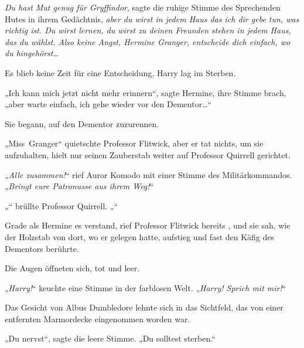 \emph{Du hast Mut genug für Gryffindor}, sagte die ruhige Stimme des Sprechenden Hutes in ihrem Gedächtnis, \emph{aber du wirst in jedem Haus das ich dir gebe tun, was richtig ist. Du wirst lernen, du wirst zu deinen Freunden stehen in jedem Haus, das du wählst. Also keine Angst, Hermine Granger, entscheide dich einfach, wo du hingehörst…}

Es blieb keine Zeit für eine Entscheidung, Harry lag im Sterben.

„Ich kann mich jetzt nicht mehr erinnern“, sagte Hermine, ihre Stimme brach, „aber warte einfach, ich gehe wieder vor den Dementor…“

Sie begann, auf den Dementor zuzurennen.

„Miss~Granger“ quietschte Professor Flitwick, aber er tat nichts, um sie aufzuhalten, hielt nur seinen Zauberstab weiter auf Professor Quirrell gerichtet.

„\emph{Alle zusammen!}“ rief Auror Komodo mit einer Stimme des Militärkommandos. „\emph{Bringt eure Patronusse aus ihrem Weg!}“

„“ brüllte Professor Quirrell. „“

Grade als Hermine es verstand, rief Professor Flitwick bereits , und sie sah, wie der Holzstab von dort, wo er gelegen hatte, aufstieg und fast den Käfig des Dementors berührte.

\later

Die Augen öffneten sich, tot und leer.

„\emph{Harry!}“ keuchte eine Stimme in der farblosen Welt. „\emph{Harry! Sprich mit mir!}“

Das Gesicht von Albus Dumbledore lehnte sich in das Sichtfeld, das von einer entfernten Marmordecke eingenommen worden war.

„Du nervst“, sagte die leere Stimme. „Du solltest sterben.“

